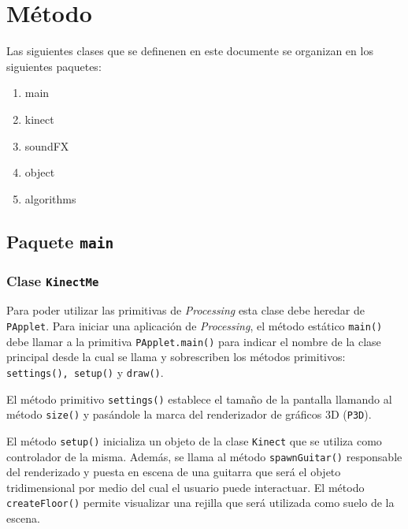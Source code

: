 \documentclass[10pt,a4paper]{report}
\begin{document}
	\section{Método}
	Las siguientes clases que se definenen en este documente se organizan en los siguientes paquetes:
	\begin{enumerate}
		\item main
		\item kinect
		\item soundFX
		\item object
		\item algorithms
	\end{enumerate}

	\subsection{Paquete \texttt{main}}
	\subsubsection{Clase \texttt{KinectMe}}
	Para poder utilizar las primitivas de \textit{Processing} esta clase debe heredar de \texttt{PApplet}. Para iniciar una aplicación de \textit{Processing}, el método estático \texttt{main()} debe llamar a la primitiva \texttt{PApplet.main()} para indicar el nombre de la clase principal desde la cual se llama y sobrescriben los métodos primitivos: \texttt{settings(), setup()} y \texttt{draw()}.
	
	
	
	El método primitivo \texttt{settings()} establece el tamaño de la pantalla llamando al método \texttt{size()} y pasándole la marca del renderizador de gráficos 3D (\texttt{P3D}).
	
	
	
	El método \texttt{setup()} inicializa un objeto de la clase \texttt{Kinect} que se utiliza como controlador de la misma. Además, se llama al método \texttt{spawnGuitar()} responsable del renderizado y puesta en escena de una guitarra que será el objeto tridimensional por medio del cual el usuario puede interactuar. El método \texttt{createFloor()} permite visualizar una rejilla que será utilizada como suelo de la escena.
	
	
	
\end{document}

